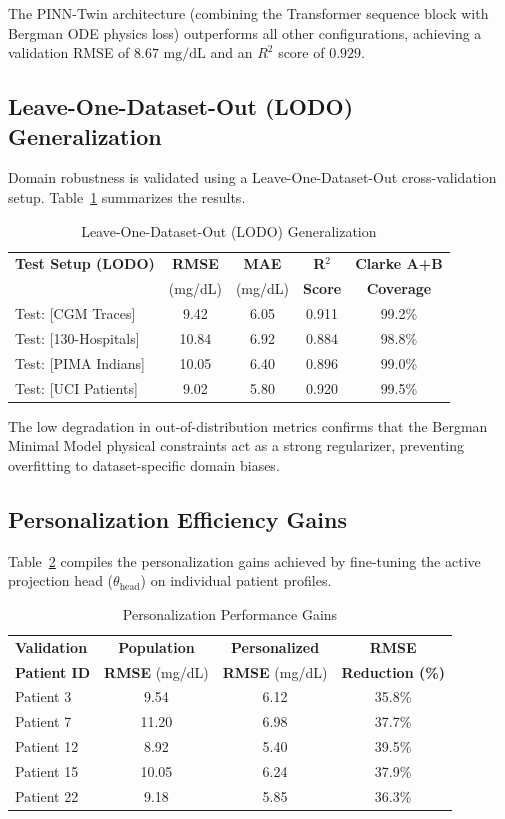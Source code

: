 \documentclass[10pt,journal,compsoc,twocolumn]{IEEEtran}
\begin{document}
The PINN-Twin architecture (combining the Transformer sequence block with Bergman ODE physics loss) outperforms all other configurations, achieving a validation RMSE of $8.67\text{ mg/dL}$ and an $R^2$ score of $0.929$.

\subsection{Leave-One-Dataset-Out (LODO) Generalization}
Domain robustness is validated using a Leave-One-Dataset-Out cross-validation setup. Table~\ref{tab:lodo_generalization} summarizes the results.

\begin{table}[h]
\centering
\caption{Leave-One-Dataset-Out (LODO) Generalization}
\label{tab:lodo_generalization}
\begin{tabular}{lcccc}
\toprule
\textbf{Test Setup (LODO)} & \textbf{RMSE} & \textbf{MAE} & \textbf{R$^{2}$} & \textbf{Clarke A+B} \\
 & (mg/dL) & (mg/dL) & \textbf{Score} & \textbf{Coverage} \\
\midrule
Test: [CGM Traces] & 9.42 & 6.05 & 0.911 & 99.2\% \\
Test: [130-Hospitals] & 10.84 & 6.92 & 0.884 & 98.8\% \\
Test: [PIMA Indians] & 10.05 & 6.40 & 0.896 & 99.0\% \\
Test: [UCI Patients] & 9.02 & 5.80 & 0.920 & 99.5\% \\
\bottomrule
\end{tabular}
\end{table}

The low degradation in out-of-distribution metrics confirms that the Bergman Minimal Model physical constraints act as a strong regularizer, preventing overfitting to dataset-specific domain biases.

\subsection{Personalization Efficiency Gains}
Table~\ref{tab:personalization} compiles the personalization gains achieved by fine-tuning the active projection head ($\theta_{\text{head}}$) on individual patient profiles.

\begin{table}[h]
\centering
\caption{Personalization Performance Gains}
\label{tab:personalization}
\begin{tabular}{lccc}
\toprule
\textbf{Validation} & \textbf{Population} & \textbf{Personalized} & \textbf{RMSE} \\
\textbf{Patient ID} & \textbf{RMSE} (mg/dL) & \textbf{RMSE} (mg/dL) & \textbf{Reduction (\%)} \\
\midrule
Patient 3 & 9.54 & 6.12 & 35.8\% \\
Patient 7 & 11.20 & 6.98 & 37.7\% \\
Patient 12 & 8.92 & 5.40 & 39.5\% \\
Patient 15 & 10.05 & 6.24 & 37.9\% \\
Patient 22 & 9.18 & 5.85 & 36.3\% \\
\bottomrule
\end{tabular}
\end{table}
\end{document}
